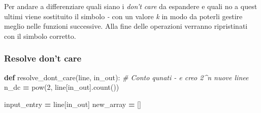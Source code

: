 \documentclass[
  italian,
]{book}
\newenvironment{Shaded}{\begin{snugshade}}{\end{snugshade}}
\newcommand{\BuiltInTok}[1]{#1}
\newcommand{\CommentTok}[1]{\textcolor[rgb]{0.56,0.35,0.01}{\textit{#1}}}
\newcommand{\DecValTok}[1]{\textcolor[rgb]{0.00,0.00,0.81}{#1}}
\newcommand{\KeywordTok}[1]{\textcolor[rgb]{0.13,0.29,0.53}{\textbf{#1}}}
\newcommand{\NormalTok}[1]{#1}
\newcommand{\OperatorTok}[1]{\textcolor[rgb]{0.81,0.36,0.00}{\textbf{#1}}}
\newcommand{\StringTok}[1]{\textcolor[rgb]{0.31,0.60,0.02}{#1}}
\begin{document}
Per andare a differenziare quali siano i \emph{don't care} da espandere e quali no a quest ultimi viene sostituito il simbolo \emph{-} con un valore \emph{k} in modo da poterli gestire meglio nelle funzioni successive. Alla fine delle operazioni verranno ripristinati con il simbolo corretto.

\newpage

\hypertarget{resolve-dont-care}{%
\subsubsection{Resolve don't care}\label{resolve-dont-care}}

\begin{Shaded}
\begin{Highlighting}[]
\KeywordTok{def}\NormalTok{ resolve\_dont\_care(line, in\_out):}
    \CommentTok{\# Conto qunati {-} e creo 2\^{}n nuove linee}
\NormalTok{    n\_dc }\OperatorTok{=} \BuiltInTok{pow}\NormalTok{(}\DecValTok{2}\NormalTok{, line[in\_out].count(}\StringTok{\textquotesingle{}{-}\textquotesingle{}}\NormalTok{))}

\NormalTok{    input\_entry }\OperatorTok{=}\NormalTok{ line[in\_out]}
\NormalTok{    new\_array }\OperatorTok{=}\NormalTok{ []}


\end{Highlighting}
\end{Shaded}
\end{document}
